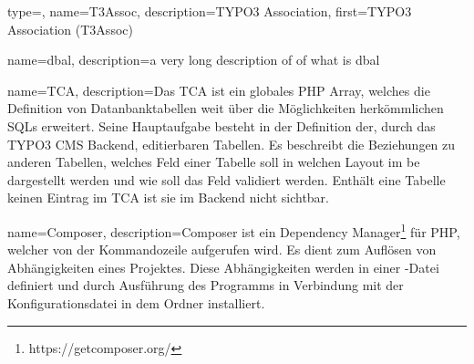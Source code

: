 

{
	type=\acronymtype,
	name={T3Assoc},
	description={TYPO3 Association},
	first={TYPO3 Association (T3Assoc)}
}

{
	name={dbal},
	description={a very long description of of what is dbal}
}

{
	name={TCA},
	description={Das TCA ist ein globales PHP Array, welches die Definition von Datanbanktabellen weit über die Möglichkeiten herkömmlichen SQLs erweitert. Seine Hauptaufgabe besteht in der Definition der, durch das TYPO3 CMS Backend, editierbaren Tabellen. Es beschreibt die Beziehungen zu anderen Tabellen, welches Feld einer Tabelle soll in welchen Layout im \gls{be} dargestellt werden und wie soll das Feld validiert werden. Enthält eine Tabelle keinen Eintrag im TCA ist sie im Backend nicht sichtbar.}
}

{
	name={Composer},
	description={Composer ist ein Dependency Manager\footnote{https://getcomposer.org/} für PHP, welcher von der Kommandozeile aufgerufen wird. Es dient zum Auflösen von Abhängigkeiten eines Projektes. Diese Abhängigkeiten werden in einer -Datei definiert und durch Ausführung des Programms in Verbindung mit der Konfigurationsdatei in dem Ordner  installiert.}
}

